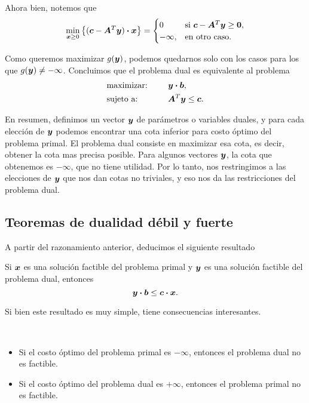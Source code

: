 Ahora bien, notemos que
$$\min_{\bm{x} \ge 0} \left\{ (\bm{c} - \bm{A}^T\bm{y}) \boldsymbol{\cdot} \bm{x} \right\} = \begin{cases}
0 & \text{si } \bm{c} - \bm{A}^T\bm{y} \ge \bm{0}, \\
-\infty, & \text{en otro caso.}\end{cases}
$$

Como queremos maximizar $g(\bm{y})$, podemos quedarnos solo con los casos para los que $g(\bm{y}) \neq -\infty$. Concluimos que el problema dual es equivalente al problema
\begin{alignat*}{2}
  & \text{maximizar: }  & \quad & \bm{y} \boldsymbol{\cdot} \bm{b},   \\
   & \text{sujeto a: }  &       & \bm{A}^T\bm{y} \le \bm{c}. \\
\end{alignat*}

En resumen, definimos un vector $\bm{y}$ de parámetros o variables duales, y para cada elección de $\bm{y}$ podemos encontrar una cota inferior para costo óptimo del problema primal. El problema dual consiste en maximizar esa cota, es decir, obtener la cota mas precisa posible. Para algunos vectores $\bm{y}$, la cota que obtenemos es $-\infty$, que no tiene utilidad. Por lo tanto, nos restringimos a las elecciones de $\bm{y}$ que nos dan cotas no triviales, y eso nos da las restricciones del problema dual.

\subsection{Teoremas de dualidad débil y fuerte}

A partir del razonamiento anterior, deducimos el siguiente resultado

\begin{theorem}
Si $\bm{x}$ es una solución factible del problema primal y $\bm{y}$ es una solución factible del problema dual, entonces
$$
\bm{y} \boldsymbol{\cdot} \bm{b} \le \bm{c} \boldsymbol{\cdot} \bm{x}.
$$
\end{theorem}

Si bien este resultado es muy simple, tiene consecuencias interesantes.

\begin{coro}~
\begin{itemize}
\item Si el costo óptimo del problema primal es $-\infty$, entonces el problema dual no es factible.
\item Si el costo óptimo del problema dual es $+\infty$, entonces el problema primal no es factible.
\end{itemize}
\end{coro}


